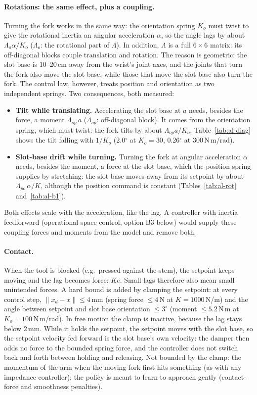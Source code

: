 \paragraph{Rotations: the same effect, plus a coupling.} Turning the fork works in the same way: the orientation
spring $K_o$ must twist to give the rotational inertia an angular acceleration $\alpha$, so the angle lags by about
$\Lambda_o \alpha / K_o$ ($\Lambda_o$: the rotational part of $\Lambda$). In addition, $\Lambda$ is a full $6\times6$
matrix: its off-diagonal blocks couple translation and rotation. The reason is geometric: the slot base is 10--20\,cm
away from the wrist's joint axes, and the joints that turn the fork also move the slot base, while those that move the
slot base also turn the fork. The control law, however, treats position and orientation as two independent springs.
Two consequences, both measured:
\begin{itemize}
  \item \textbf{Tilt while translating.} Accelerating the slot base at $a$ needs, besides the force, a moment
        $\Lambda_{op}\, a$ ($\Lambda_{op}$: off-diagonal block). It comes from the orientation spring, which must twist:
        the fork tilts by about $\Lambda_{op} a / K_o$. Table~\ref{tab:al-diag} shows the tilt falling with $1/K_o$
        (2.0$^\circ$ at $K_o = 30$, 0.26$^\circ$ at 300\,N\,m/rad).
  \item \textbf{Slot-base drift while turning.} Turning the fork at angular acceleration $\alpha$ needs, besides the moment, a
        force at the slot base, which the position spring supplies by stretching: the slot base moves away from its setpoint by
        about $\Lambda_{po}\,\alpha / K$, although the position command is constant (Tables~\ref{tab:al-rot}
        and~\ref{tab:al-b1}).
\end{itemize}
Both effects scale with the acceleration, like the lag. A controller with inertia feedforward (operational-space
control, option B3 below) would supply these coupling forces and moments from the model and remove both.

\paragraph{Contact.} When the tool is blocked (e.g.\ pressed against the stem), the setpoint keeps moving and the
lag becomes force: $K e$. Small lags therefore also mean small unintended forces. A hard bound is added by
clamping the setpoint: at every control step, $\lVert x_d - x \rVert \le 4$\,mm (spring force $\le 4$\,N at
$K = 1000$\,N/m) and the angle between setpoint and slot base orientation $\le 3^\circ$ (moment $\le 5.2$\,N\,m at
$K_o = 100$\,N\,m/rad). In free motion the clamp is inactive, because the lag stays below 2\,mm. While it holds the
setpoint, the setpoint moves with the slot base, so the setpoint velocity fed forward is the slot base's own velocity: the damper
then adds no force to the bounded spring force, and the controller does not switch back and forth between holding and
releasing. Not bounded by the clamp: the momentum of the arm when the moving fork first hits something (as with any
impedance controller); the policy is meant to learn to approach gently (contact-force and smoothness penalties).

